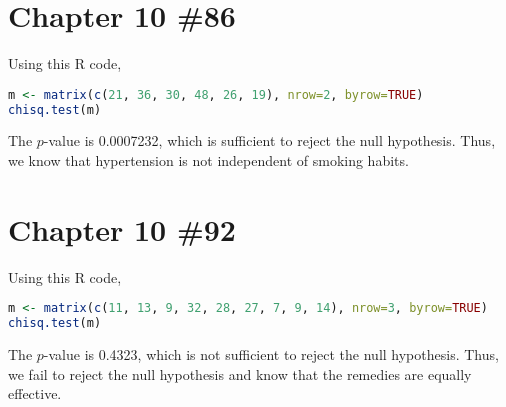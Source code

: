 \documentclass{scrartcl}
\begin{document}
\section{Chapter 10 \#86}
Using this R code,
\begin{lstlisting}[language=R]
m <- matrix(c(21, 36, 30, 48, 26, 19), nrow=2, byrow=TRUE)
chisq.test(m)
\end{lstlisting}
The \(p\)-value is 0.0007232, which is sufficient to reject the null
hypothesis. Thus, we know that hypertension is not independent of smoking
habits.

\section{Chapter 10 \#92}
Using this R code,
\begin{lstlisting}[language=R]
m <- matrix(c(11, 13, 9, 32, 28, 27, 7, 9, 14), nrow=3, byrow=TRUE)
chisq.test(m)
\end{lstlisting}
The \(p\)-value is 0.4323, which is not sufficient to reject the null
hypothesis. Thus, we fail to reject the null hypothesis and know that the
remedies are equally effective.
\end{document}
